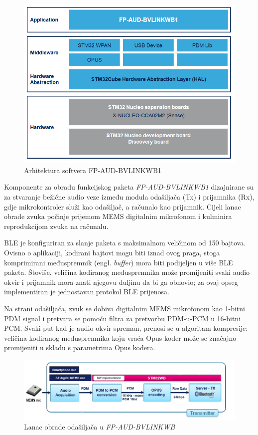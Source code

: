 \begin{figure}[ht]
	\includegraphics[width=\linewidth]{imgs/firmware_software_arch}
	\caption{Arhitektura softvera FP-AUD-BVLINKWB1}
	\label{fig:firmware_software_arch}
\end{figure}

Komponente za obradu funkcijskog paketa \textit{FP-AUD-BVLINKWB1} dizajnirane su za stvaranje bežične audio veze između modula odašiljača (Tx) i prijamnika (Rx), gdje mikrokontroler služi kao odašiljač, a računalo kao prijamnik. Cijeli lanac obrade zvuka počinje prijemom MEMS digitalnim mikrofonom i kulminira reprodukcijom zvuka na računalu.

BLE je konfiguriran za slanje paketa s maksimalnom veličinom od 150 bajtova. Ovisno o aplikaciji, kodirani bajtovi mogu biti iznad ovog praga, stoga komprimirani međuspremnik (engl. \textit{buffer}) mora biti podijeljen u više BLE paketa. Štoviše, veličina kodiranog međuspremnika može promijeniti svaki audio okvir i prijamnik mora znati njegovu duljinu da bi ga obnovio; za ovaj opseg implementiran je jednostavan protokol BLE prijenosa.

Na strani odašiljača, zvuk se dobiva digitalnim MEMS mikrofonom kao 1-bitni PDM signal i pretvara se pomoću filtra za pretvorbu PDM-u-PCM u 16-bitni PCM. Svaki put kad je audio okvir spreman, prenosi se u algoritam kompresije: veličina kodiranog međuspremnika koju vraća Opus koder može se značajno promijeniti u skladu s parametrima Opus kodera.

\begin{figure}[ht]
	\includegraphics[width=\linewidth]{imgs/duplex_chain}
	\caption{Lanac obrade odašiljača u \textit{FP-AUD-BVLINKWB}}
	\label{fig:duplex_chain}
\end{figure}

